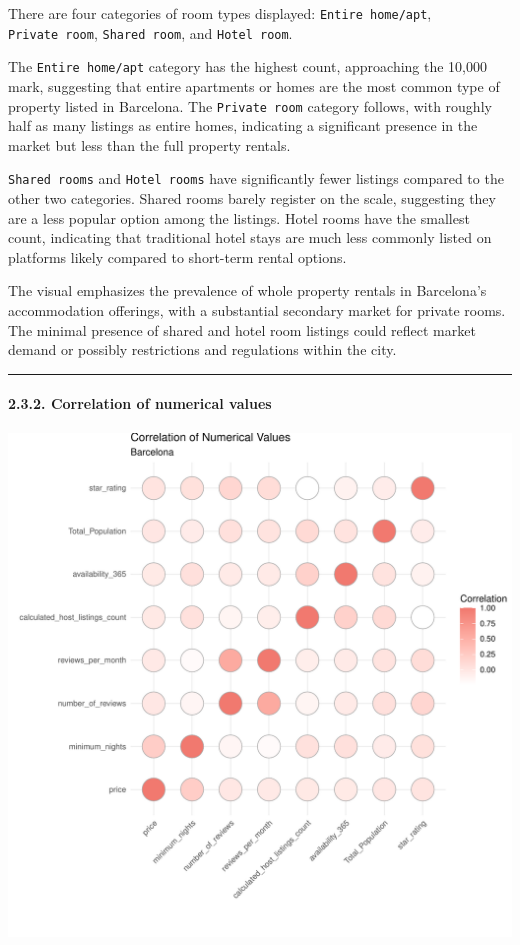 \documentclass[
]{article}
\begin{document}
There are four categories of room types displayed:
\texttt{Entire\ home/apt}, \texttt{Private\ room},
\texttt{Shared\ room}, and \texttt{Hotel\ room}.

The \texttt{Entire\ home/apt} category has the highest count,
approaching the 10,000 mark, suggesting that entire apartments or homes
are the most common type of property listed in Barcelona. The
\texttt{Private\ room} category follows, with roughly half as many
listings as entire homes, indicating a significant presence in the
market but less than the full property rentals.

\texttt{Shared\ rooms} and \texttt{Hotel\ rooms} have significantly
fewer listings compared to the other two categories. Shared rooms barely
register on the scale, suggesting they are a less popular option among
the listings. Hotel rooms have the smallest count, indicating that
traditional hotel stays are much less commonly listed on platforms
likely compared to short-term rental options.

The visual emphasizes the prevalence of whole property rentals in
Barcelona's accommodation offerings, with a substantial secondary market
for private rooms. The minimal presence of shared and hotel room
listings could reflect market demand or possibly restrictions and
regulations within the city.

\begin{center}\rule{0.5\linewidth}{0.5pt}\end{center}

\hypertarget{correlation-of-numerical-values}{%
\paragraph{2.3.2. Correlation of numerical
values}\label{correlation-of-numerical-values}}

\begin{center}\includegraphics{Barcelona-AirBnB-Insights_files/figure-latex/plot2-1} \end{center}
\end{document}
